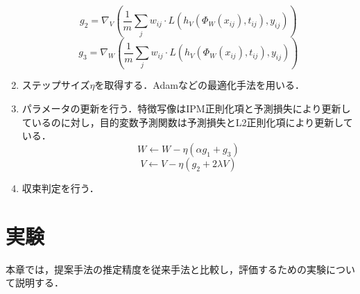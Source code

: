 \documentclass[dvipdfmx]{jreport}
\begin{document}
\begin{tcolorbox}[title=\textbf{CFRアルゴリズム}]
\begin{enumerate}
        \begin{equation}
            g_2 = \nabla_V \left( \frac{1}{m} \sum_j w_{ij} \cdot L(h_V(\Phi_W(x_{ij}), t_{ij}), y_{ij}) \right)
            \end{equation}
            \begin{equation}
            g_3 = \nabla_W \left( \frac{1}{m} \sum_j w_{ij} \cdot L(h_V(\Phi_W(x_{ij}), t_{ij}), y_{ij}) \right)
            \end{equation}
        \item ステップサイズ$\eta$を取得する．Adamなどの最適化手法を用いる．
        \item パラメータの更新を行う．特徴写像はIPM正則化項と予測損失により更新しているのに対し，目的変数予測関数は予測損失とL2正則化項により更新している．
        \begin{equation}
            W \leftarrow W - \eta \left( \alpha g_1 + g_3 \right)
            \end{equation}
            \begin{equation}
            V \leftarrow V - \eta \left( g_2 + 2\lambda V \right)
            \end{equation}
        \item 収束判定を行う．
    \end{enumerate}
\end{tcolorbox}

\section{実験}
本章では，提案手法の推定精度を従来手法と比較し，評価するための実験について説明する．
\end{document}
